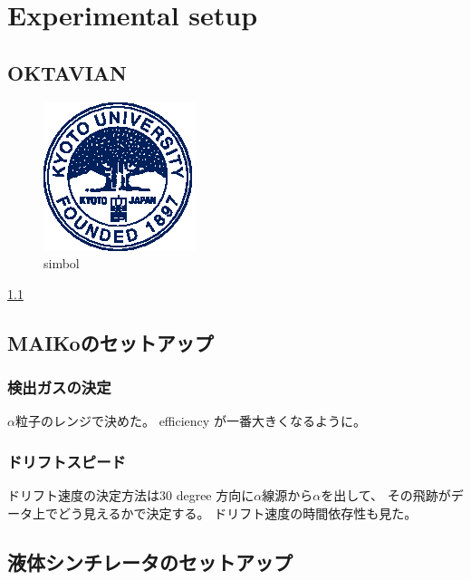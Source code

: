 \chapter{Experimental setup}
\section{OKTAVIAN}
\begin{figure}
  \centering
  \includegraphics[width=0.5\columnwidth]{eps/E-C.eps}
  \caption{simbol}
  \label{fig:simbol}
\end{figure}
\ref{fig:simbol}
\section{MAIKoのセットアップ}
\subsection{検出ガスの決定}
$\alpha$粒子のレンジで決めた。
efficiency が一番大きくなるように。
\subsection{ドリフトスピード}
ドリフト速度の決定方法は30 degree 方向に$\alpha$線源から$\alpha$を出して、
その飛跡がデータ上でどう見えるかで決定する。
ドリフト速度の時間依存性も見た。
\section{液体シンチレータのセットアップ}
